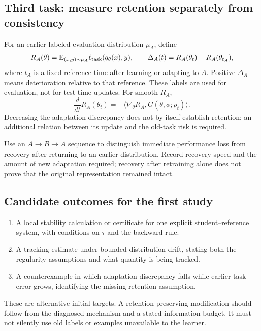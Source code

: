 \documentclass[11pt,a4paper]{article}
\newcommand{\E}{\mathbb{E}}
\newif\ifdraftnotes
\newcommand{\draftnote}[1]{\ifdraftnotes\par\smallskip
  {\small\color{gray}\noindent\textit{To develop:} #1\par}\smallskip\fi}
\begin{document}
\subsection{Third task: measure retention separately from consistency}
For an earlier labeled evaluation distribution $\mu_A$, define
\begin{equation}
 R_A(\theta)=\E_{(x,y)\sim\mu_A}
 \ell_{\rm task}(q_\theta(x),y),\qquad
 \Delta_A(t)=R_A(\theta_t)-R_A(\theta_{t_A}),
 \label{eq:retention}
\end{equation}
where $t_A$ is a fixed reference time after learning or adapting to $A$.
Positive $\Delta_A$ means deterioration relative to that reference.
These labels are used for evaluation, not for test-time updates.
For smooth $R_A$,
\begin{equation}
 \frac{d}{dt}R_A(\theta_t)
 =-\langle\nabla_\theta R_A,G(\theta,\phi;\rho_t)\rangle.
 \label{eq:interference}
\end{equation}
Decreasing the adaptation discrepancy does not by itself establish retention:
an additional relation between its update and the old-task risk is required.

Use an $A\to B\to A$ sequence to distinguish immediate performance loss
from recovery after returning to an earlier distribution. Record recovery
speed and the amount of new adaptation required; recovery after retraining
alone does not prove that the original representation remained intact.
\draftnote{Use the forgetting readings to define recoverability. Decide
whether the first analysis concerns old-task risk, representation change,
or access to retained information, and justify the connection between
the chosen quantities.}

\subsection{Candidate outcomes for the first study}
\begin{enumerate}
 \item A local stability calculation or certificate for one explicit
 student--reference system, with conditions on $\tau$ and the backward rule.
 \item A tracking estimate under bounded distribution drift, stating both
 the regularity assumptions and what quantity is being tracked.
 \item A counterexample in which adaptation discrepancy falls while
 earlier-task error grows, identifying the missing retention assumption.
\end{enumerate}
These are alternative initial targets. A retention-preserving modification
should follow from the diagnosed mechanism and a stated information budget.
It must not silently use old labels or examples unavailable to the learner.
\end{document}
